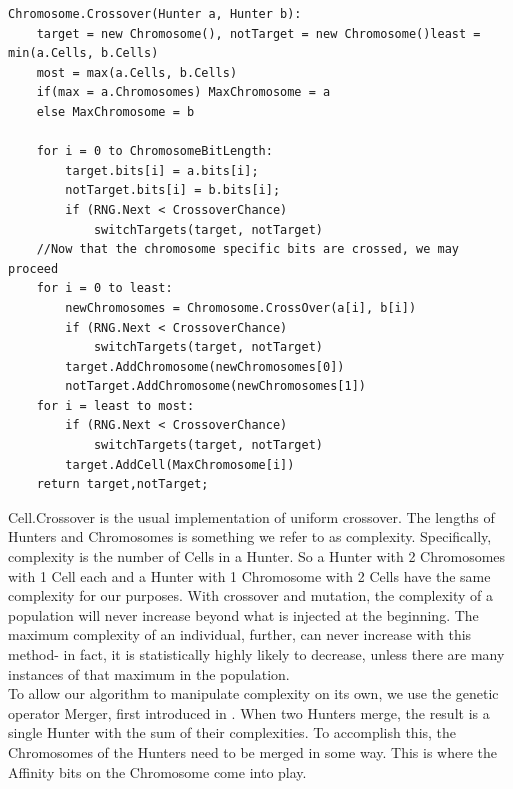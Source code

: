 \begin{lstlisting}[language = algorithm, caption={Chromosome Crossover}, label={fig:ChromoXover}]
Chromosome.Crossover(Hunter a, Hunter b):
	target = new Chromosome(), notTarget = new Chromosome()least = min(a.Cells, b.Cells)
	most = max(a.Cells, b.Cells)
	if(max = a.Chromosomes) MaxChromosome = a
	else MaxChromosome = b
	
	for i = 0 to ChromosomeBitLength:
		target.bits[i] = a.bits[i];
		notTarget.bits[i] = b.bits[i];
		if (RNG.Next < CrossoverChance)
			switchTargets(target, notTarget)
	//Now that the chromosome specific bits are crossed, we may proceed	
	for i = 0 to least:
		newChromosomes = Chromosome.CrossOver(a[i], b[i])
		if (RNG.Next < CrossoverChance)
			switchTargets(target, notTarget)
		target.AddChromosome(newChromosomes[0])
		notTarget.AddChromosome(newChromosomes[1])
	for i = least to most:
		if (RNG.Next < CrossoverChance) 
			switchTargets(target, notTarget)	
		target.AddCell(MaxChromosome[i])
	return target,notTarget;
\end{lstlisting}
Cell.Crossover is the usual implementation of uniform crossover.
The lengths of Hunters and Chromosomes is something we refer to as complexity.  Specifically, complexity is the number of Cells in a Hunter.  So a Hunter with 2 Chromosomes with 1 Cell each and a Hunter with 1 Chromosome with 2 Cells have the same complexity for our purposes.  
With crossover and mutation, the complexity of a population will never increase beyond what is injected at the beginning.  The maximum complexity of an individual, further, can never increase with this method- in fact, it is statistically highly likely to decrease, unless there are many instances of that maximum in the population.\\
To allow our algorithm to manipulate complexity on its own, we use the genetic operator Merger, first introduced in \cite{kharma_project_2004}.  When two Hunters merge, the result is a single Hunter with the sum of their complexities.  To accomplish this, the Chromosomes of the Hunters need to be merged in some way.  This is where the Affinity bits on the Chromosome come into play.\\

